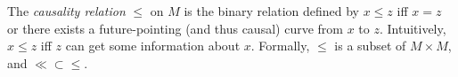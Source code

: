 The \emph{causality relation} $\leq$ on $M$ is the binary relation defined by $x \leq z$ iff $x = z$ or there exists a future-pointing (and thus causal) curve from $x$ to $z$. Intuitively, $x \leq z$ iff $z$ can get some information about $x$. Formally, $\leq$ is a subset of $M \times M$, and $\ll \subset \leq$.
